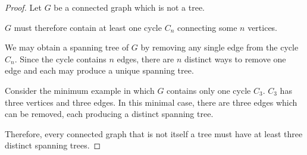 \documentclass[11pt, letterpaper, includehead]{article}
\theoremstyle{plain}
\theoremstyle{mydefinition}
\theoremstyle{myproperty}
\begin{document}
\begin{enumerate}[label=\textbf{\arabic*}., leftmargin=*]
\begin{proof}
        Let $G$ be a connected graph which is not a tree.

        $G$ must therefore contain at least one cycle $C_n$ connecting some $n$ vertices.  

        We may obtain a spanning tree of $G$ by removing any single edge from the cycle $C_n$. Since the cycle contains $n$ edges, there are $n$ distinct ways to remove one edge and each may produce a unique spanning tree.

        Consider the minimum example in which $G$ contains only one cycle $C_3$. $C_3$ has three vertices and three edges. In this minimal case, there are three edges which can be removed, each producing a distinct spanning tree. 

        Therefore, every connected graph that is not itself a tree must have at least three distinct spanning trees.
    \end{proof}

\end{enumerate}
\end{document}
